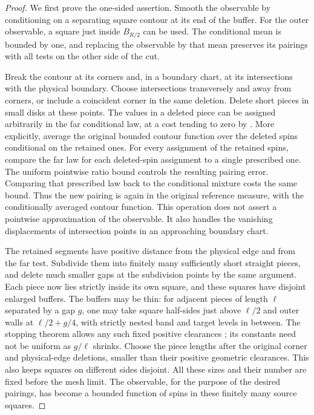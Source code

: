 \begin{proof}
We first prove the one-sided assertion.  Smooth the observable by
conditioning on a separating square contour at its end of the
buffer.  For the outer observable, a square just inside $B_{R/2}$
can be used.  The conditional mean is bounded by one, and replacing
the observable by that mean preserves its pairings with all tests on
the other side of the cut.

Break the contour at its corners and, in a boundary chart, at its
intersections with the physical boundary.  Choose intersections
transversely and away from corners, or include a coincident corner
in the same deletion.  Delete short pieces in small disks at these
points.  The values in a deleted piece can be assigned arbitrarily
in the far conditional law, at a cost tending to zero by
.  More explicitly, average the original bounded
contour function over the deleted spins conditional on the retained
ones.  For every assignment of the retained spins, compare the far
law for each deleted-spin assignment to a single prescribed one.
The uniform pointwise ratio bound controls the resulting pairing
error.  Comparing that prescribed law back to the conditional mixture
costs the same bound.  Thus the new pairing is again in the original
reference measure, with the conditionally averaged contour function.
This operation does not assert a pointwise approximation of
the observable.  It also handles the vanishing displacements of
intersection points in an approaching boundary chart.

The retained segments have positive distance from the physical edge
and from the far test.  Subdivide them into finitely many sufficiently
short straight pieces, and delete much smaller gaps at the subdivision
points by the same argument.  Each piece now lies strictly inside its
own square, and these squares have disjoint enlarged buffers.  The buffers may be thin: for adjacent pieces of length $\ell$ separated
by a gap $g$, one may take square half-sides just above $\ell/2$ and
outer walls at $\ell/2+g/4$, with strictly nested band and target levels
in between. The stopping theorem allows any such fixed positive
clearances \cite[Remark~7.1]{IsingToolkit}; its constants need not be uniform as $g/\ell$ shrinks.
Choose the piece lengths after the original corner and physical-edge
deletions, smaller than their positive geometric clearances. This also
keeps squares on different sides disjoint. All these sizes and their
number are fixed before the mesh limit.  The
observable, for the purpose of the desired pairings, has become a
bounded function of spins in these finitely many source squares.


\end{proof}
